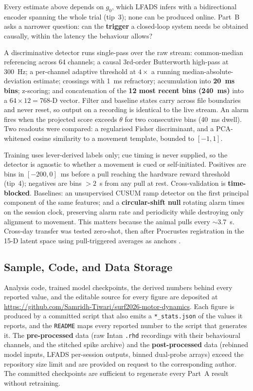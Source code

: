 \documentclass[10pt,twocolumn]{article}
\begin{document}
Every estimate above depends on $g_0$, which LFADS infers with a bidirectional
encoder spanning the whole trial (tip~3); none can be produced online. Part~B
asks a narrower question: can the \textbf{trigger} a closed-loop system needs be
obtained causally, within the latency the behaviour allows?

A discriminative detector runs single-pass over the raw stream: common-median
referencing across 64 channels; a causal 3rd-order Butterworth high-pass at
300~Hz; a per-channel adaptive threshold at $4\times$ a running
median-absolute-deviation estimate; crossings with 1~ms refractory; accumulation
into \textbf{20~ms bins}; z-scoring; and concatenation of the \textbf{12 most
recent bins (240~ms)} into a $64\times12=768$-D vector. Filter and baseline
states carry across file boundaries and never reset, so output on a recording is
identical to the live stream. An alarm fires when the projected score exceeds
$\theta$ for two consecutive bins (40~ms dwell). Two readouts were compared: a
regularised Fisher discriminant, and a PCA-whitened cosine similarity to a
movement template, bounded to $[-1,1]$.

Training uses lever-derived labels only; cue timing is never supplied, so the
detector is agnostic to whether a movement is cued or self-initiated. Positives
are bins in $[-200,0]$~ms before a pull reaching the hardware reward threshold
(tip~4); negatives are bins $>2$~s from any pull at rest. Cross-validation is
\textbf{time-blocked}. Baselines: an unsupervised CUSUM \cite{page1954} ramp
detector on the first principal component of the same features; and a
\textbf{circular-shift null} rotating alarm times on the session clock,
preserving alarm rate and periodicity while destroying only alignment to
movement. This matters because the animal pulls every $\sim$3.7~s. Cross-day
transfer was tested zero-shot, then after Procrustes registration in the 15-D
latent space using pull-triggered averages as anchors
\cite{gallego2020,degenhart2020}.

\subsection{Sample, Code, and Data Storage}

Analysis code, trained model checkpoints, the derived numbers behind every
reported value, and the editable source for every figure are deposited at
\url{https://github.com/Samridh-Tiwari/surf2026-motor-dynamics}. Each figure is
produced by a committed script that also emits a \texttt{*\_stats.json} of the
values it reports, and the \texttt{README} maps every reported number to the
script that generates it. The \textbf{pre-processed} data (raw Intan
\texttt{.rhd} recordings with their behavioural channels, and the stitched spike
archive) and the \textbf{post-processed} data (rebinned model inputs, LFADS
per-session outputs, binned dual-probe arrays) exceed the repository size limit
and are provided on request to the corresponding author. The committed checkpoints are sufficient to regenerate
every Part~A result without retraining.
\end{document}
